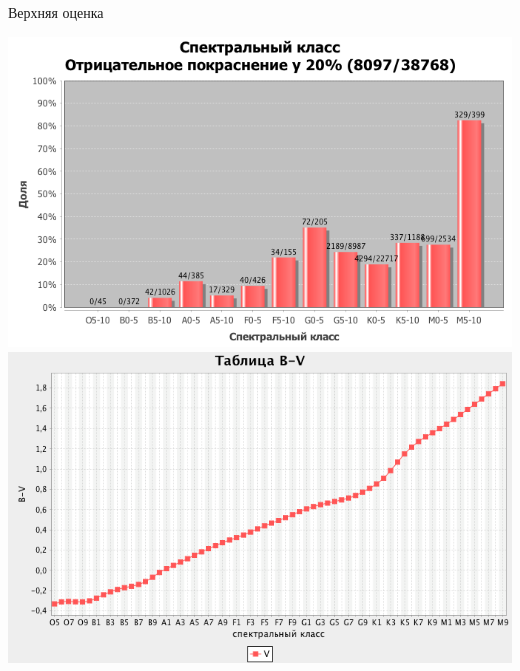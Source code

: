 \documentclass[14pt, fleqn, xcolor={dvipsnames, table}]{beamer}
\begin{document}
        \begin{frame}{Верхняя оценка}
            \begin{center}
                \includegraphics[scale=0.24]{outlier-spectV.png}
			    \includegraphics[scale=0.24]{table-tsvetkovV.png}
                                

\end{center}
\end{frame}
\end{document}
